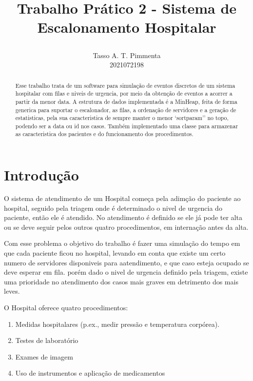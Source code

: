 \documentclass[a4paper,12pt]{article}
\title{
    \begin{center}
    \textbf{\fontsize{12}{14} \selectfont Trabalho Prático 2 - Sistema de Escalonamento Hospitalar}
    \end{center}
}
\author{Tasso A. T. Pimmenta \\ 2021072198}
\begin{document}
\maketitle

\tableofcontents

\begin{abstract}
    Esse trabalho trata de um software para simulação de eventos discretos de um sistema hospitalar com filas e niveis de urgencia,
    por meio da obtenção de eventos a acorrer a partir da menor data. A estrutura de dados implementada é a MinHeap, feita de forma generica 
    para suportar o escalonador, as filas, a ordenação de servidores e a geração de estatisticas, pela sua caracteristica de sempre manter o 
    menor `sortparam'' no topo, podendo ser a data ou id nos casos. Também implementado uma classe para armazenar as caracteristica dos pacientes e
    do funcionamento dos procedimentos.
\end{abstract}

\newpage

\section{Introdução}
\hspace*{1cm}
O sistema de atendimento de um Hospital começa pela adimção do paciente ao hospital,
seguido pela triagem onde é determinado o nivel de urgencia do paciente, então ele é atendido.
No atendimento é definido se ele já pode ter alta ou se deve seguir pelos outros quatro procedimentos,
em internação antes da alta.

Com esse problema o objetivo do trabalho é fazer uma simulação do tempo em que cada paciente ficou no hospital,
levando em conta que existe um certo numero de servidores disponiveis para aatendimento, e que caso esteja ocupado se deve esperar em fila.
porém dado o nivel de urgencia definido pela triagem, existe uma prioridade no atendimento dos casos mais graves em detrimento dos mais leves.

O Hospital oferece quatro procedimentos:
\begin{enumerate}
    \item Medidas hospitalares (p.ex., medir pressão e temperatura corpórea).
    \item Testes de laboratório
    \item Exames de imagem
    \item Uso de instrumentos e aplicação de medicamentos
\end{enumerate}
\end{document}
